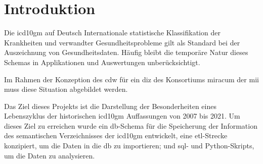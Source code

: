 \chapter{Introduktion}

	Die \ac{icd10gm} auf Deutsch Internationale statistische Klassifikation der Krankheiten und  verwandter Gesundheitsprobleme gilt als Standard bei der Auszeichnung von Gesundheitsdaten. Häufig bleibt die temporäre Natur dieses Schemas in Applikationen und Auswertungen unberücksichtigt.
	
	Im Rahmen der Konzeption des \ac{cdw} für ein  \ac{diz} des Konsortiums \ac{miracum} der \ac{mii} muss diese Situation abgebildet werden.%
	
	Das Ziel dieses Projekts ist die Darstellung der Besonderheiten eines Lebenszyklus der historischen \ac{icd10gm} Auffassungen von 2007 bis 2021. Um dieses Ziel zu erreichen wurde ein \ac{db}-Schema für die Speicherung der Information des semantischen Verzeichnisses der \ac{icd10gm} entwickelt, eine \ac{etl}-Strecke konzipiert, um die Daten in die \ac{db} zu importieren; und \ac{sql}- und Python-Skripts, um die Daten zu analysieren.
	